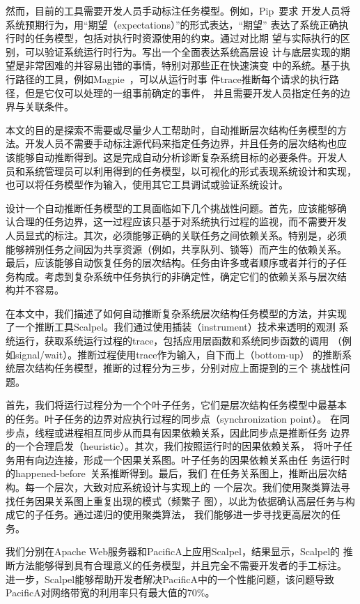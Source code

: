 然而，目前的工具需要开发人员手动标注任务模型。例如，Pip~\cite{pip}要求
开发人员将系统预期行为，用“期望（expectations）”的形式表达，“期望”
表达了系统正确执行时的任务模型，包括对执行时资源使用的约束。通过对比期
望与实际执行的区别，可以验证系统运行时行为。写出一个全面表达系统高层设
计与底层实现的期望是非常困难的并容易出错的事情，特别对那些正在快速演变
中的系统。基于执行路径的工具，例如Magpie~\cite{magpie}，可以从运行时事
件trace推断每个请求的执行路径，但是它仅可以处理的一组事前确定的事件，
并且需要开发人员指定任务的边界与关联条件。

本文的目的是探索不需要或尽量少人工帮助时，自动推断层次结构任务模型的方
法。开发人员不需要手动标注源代码来指定任务边界，并且任务的层次结构也应
该能够自动推断得到。这是完成自动分析诊断复杂系统目标的必要条件。开发人
员和系统管理员可以利用得到的任务模型，以可视化的形式表现系统设计和实现，
也可以将任务模型作为输入，使用其它工具调试或验证系统设计。

设计一个自动推断任务模型的工具面临如下几个挑战性问题。首先，应该能够确
认合理的任务边界，这一过程应该只基于对系统执行过程的监视，而不需要开发
人员显式的标注。其次，必须能够正确的关联任务之间依赖关系。特别是，必须
能够辨别任务之间因为共享资源（例如，共享队列、锁等）而产生的依赖关系。
最后，应该能够自动恢复任务的层次结构。任务由许多或者顺序或者并行的子任
务构成。考虑到复杂系统中任务执行的非确定性，确定它们的依赖关系与层次结
构并不容易。

在本文中，我们描述了如何自动推断复杂系统层次结构任务模型的方法，并实现
了一个推断工具Scalpel。我们通过使用插装（instrument）技术来透明的观测
系统运行，获取系统运行过程的trace，包括应用层函数和系统同步函数的调用
（例如signal/wait）。推断过程使用trace作为输入，自下而上（bottom-up）
的推断系统层次结构任务模型，推断的过程分为三步，分别对应上面提到的三个
挑战性问题。

首先，我们将运行过程分为一个个叶子任务，它们是层次结构任务模型中最基本
的任务。叶子任务的边界对应执行过程的同步点（synchronization point）。
在同步点，线程或进程相互同步从而具有因果依赖关系，因此同步点是推断任务
边界的一个合理启发（heuristic）。其次，我们按照运行时的因果依赖关系，
将叶子任务用有向边连接，形成一个因果关系图。叶子任务的因果依赖关系由任
务运行时的happened-before~\cite{lamport_clock}关系推断得到。最后，我们
在任务关系图上，推断出层次结构。每一个层次，大致对应系统设计与实现上的
一个层次。我们使用聚类算法寻找任务因果关系图上重复出现的模式（频繁子
图），以此为依据确认高层任务与构成它的子任务。通过递归的使用聚类算法，
我们能够进一步寻找更高层次的任务。

我们分别在Apache Web服务器和PacificA上应用Scalpel，结果显示，Scalpel的
推断方法能够得到具有合理意义的任务模型，并且完全不需要开发者的手工标注。
进一步，Scalpel能够帮助开发者解决PacificA中的一个性能问题，该问题导致
PacificA对网络带宽的利用率只有最大值的70\%。

